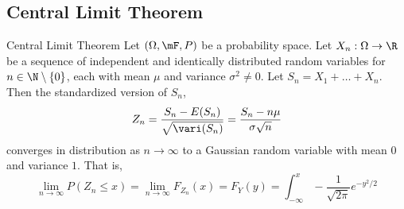 \documentclass[a4paper]{article}
\begin{document}
\subsection{Central Limit Theorem}
\begin{thm}{Central Limit Theorem}{} Let $(\Omega,\mF,P)$ be a probability space. Let $X_n:\Omega\to\R$ be a sequence of independent and identically distributed random variables for $n\in\N\setminus\{0\}$, each with mean $\mu$ and variance $\sigma^2\neq 0$. Let $S_n=X_1+\dots+X_n$. Then the standardized version of $S_n$, $$Z_n=\frac{S_n-E(S_n)}{\sqrt{\vari(S_n)}}=\frac{S_n-n\mu}{\sigma\sqrt{n}}$$ converges in distribution as $n\to\infty$ to a Gaussian random variable with mean $0$ and variance $1$. That is, $$\lim_{n\to\infty}P(Z_n\leq x)=\lim_{n\to\infty}F_{Z_n}(x)=F_Y(y)=\int_{-\infty}^{x}-\frac{1}{\sqrt{2\pi}}e^{-y^2/2}$$
\end{thm}
\end{document}
